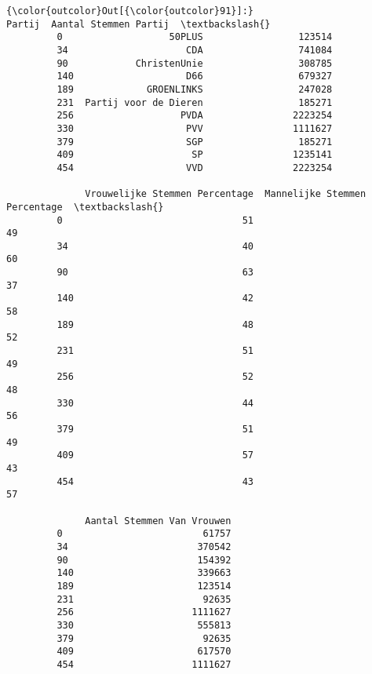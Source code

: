 \documentclass{article}
\begin{document}
            \begin{Verbatim}[commandchars=\\\{\}]
{\color{outcolor}Out[{\color{outcolor}91}]:}                     Partij  Aantal Stemmen Partij  \textbackslash{}
         0                   50PLUS                 123514   
         34                     CDA                 741084   
         90            ChristenUnie                 308785   
         140                    D66                 679327   
         189             GROENLINKS                 247028   
         231  Partij voor de Dieren                 185271   
         256                   PVDA                2223254   
         330                    PVV                1111627   
         379                    SGP                 185271   
         409                     SP                1235141   
         454                    VVD                2223254   
         
              Vrouwelijke Stemmen Percentage  Mannelijke Stemmen Percentage  \textbackslash{}
         0                                51                             49   
         34                               40                             60   
         90                               63                             37   
         140                              42                             58   
         189                              48                             52   
         231                              51                             49   
         256                              52                             48   
         330                              44                             56   
         379                              51                             49   
         409                              57                             43   
         454                              43                             57   
         
              Aantal Stemmen Van Vrouwen  
         0                         61757  
         34                       370542  
         90                       154392  
         140                      339663  
         189                      123514  
         231                       92635  
         256                     1111627  
         330                      555813  
         379                       92635  
         409                      617570  
         454                     1111627  
\end{Verbatim}
        
\end{document}
